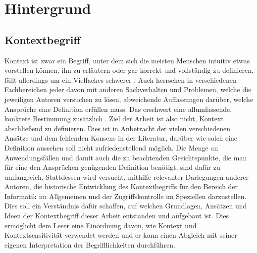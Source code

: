 \chapter{Hintergrund}%
\label{cha:background}


\section{Kontextbegriff}
Kontext ist zwar ein Begriff, unter dem sich die meisten Menschen intuitiv etwas vorstellen können, ihn zu erläutern oder gar korrekt und vollständig zu definieren, fällt allerdings um ein Vielfaches schwerer \cite{dey_understanding_2001}. Auch herrschen in verschiedenen Fachbereichen jeder davon mit anderen Sachverhalten und Problemen, welche die jeweiligen Autoren versuchen zu lösen, abweichende Auffassungen darüber, welche Ansprüche eine Definition erfüllen muss. Das erschwert eine allumfassende, konkrete Bestimmung zusätzlich \cite{hutchison_understanding_2005}. Ziel der Arbeit ist also nicht, Kontext abschließend zu definieren. Dies ist in Anbetracht der vielen verschiedenen Ansätze und dem fehlenden Konsens in der Literatur, darüber wie solch eine Definition aussehen soll \cite{alegre_engineering_2016, wei_liu_survey_2011} nicht zufriedenstellend möglich. Die Menge an Anwendungsfällen und damit auch die zu beachtenden Gesichtspunkte, die man für eine den Ansprüchen genügenden Definition benötigt, sind dafür zu umfangreich. Stattdessen wird versucht, mithilfe relevanter Darlegungen anderer Autoren, die historische Entwicklung des Kontextbegriffs für den Bereich der Informatik im Allgemeinen und der Zugriffskontrolle im Speziellen darzustellen. Dies soll ein Verständnis dafür schaffen, auf welchen Grundlagen, Ansätzen und Ideen der Kontextbegriff dieser Arbeit entstanden und aufgebaut ist. Dies ermöglicht dem Leser eine Einordnung davon, wie Kontext und Kontextsensitivität verwendet werden und er kann einen Abgleich mit seiner eigenen Interpretation der Begrifflichkeiten durchführen.
